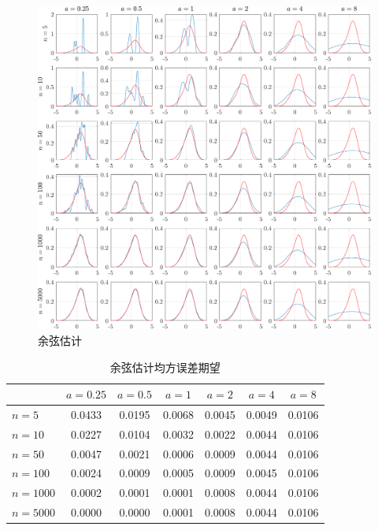 \documentclass{article}
\begin{document}
\begin{figure}[htbp]
  \centering
  \includegraphics[width=7in]{cosineWindow.pdf}
  \caption{余弦估计}
  \label{fig:coswin}
\end{figure}

\begin{table}[htbp]
  \centering
  \begin{tabular}{l|cccccc}
  \hline
           & $a=0.25$ & $a=0.5$ & $a=1$  & $a=2$  & $a=4$  & $a=8$  \\ \hline
  $n=5$    & 0.0433   & 0.0195  & 0.0068 & 0.0045 & 0.0049 & 0.0106 \\
  $n=10$   & 0.0227   & 0.0104  & 0.0032 & 0.0022 & 0.0044 & 0.0106 \\
  $n=50$   & 0.0047   & 0.0021  & 0.0006 & 0.0009 & 0.0044 & 0.0106 \\
  $n=100$  & 0.0024   & 0.0009  & 0.0005 & 0.0009 & 0.0045 & 0.0106 \\
  $n=1000$ & 0.0002   & 0.0001  & 0.0001 & 0.0008 & 0.0044 & 0.0106 \\
  $n=5000$ & 0.0000   & 0.0000  & 0.0001 & 0.0008 & 0.0044 & 0.0106 \\ \hline
  \end{tabular}
  \caption{余弦估计均方误差期望}
  \label{tab:cosMeanMSE}
\end{table}
\end{document}
